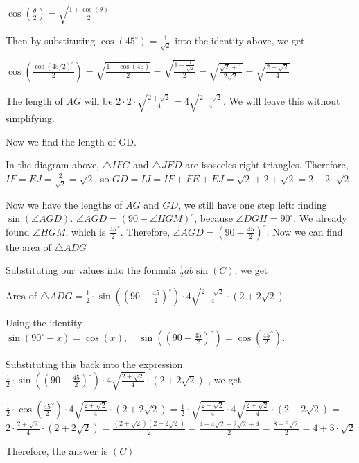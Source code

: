 \begin{enumerate}
 $\cos\left(\frac{\theta}{2}\right) = \sqrt{\frac{1+\cos(\theta)}{2}}$

 Then by substituting $\cos(45^\circ) = \frac{1}{\sqrt{2}}$ into the identity above, we get 

 $\cos\left(\frac{\cos(45/2)^\circ}{2}\right) = \sqrt{\frac{1+\cos(45)}{2}} = \sqrt{\frac{1+\frac{1}{\sqrt{2}}}{2}} = \sqrt{\frac{\sqrt{2}+1}{2\sqrt{2}}} = \sqrt{\frac{2+\sqrt{2}}{4}}$

 The length of $AG$ will be $2 \cdot 2 \cdot \sqrt{\frac{2+\sqrt{2}}{4}} = 4 \sqrt{\frac{2+\sqrt{2}}{4}}$. We will leave this without simplifying. 

 Now we find the length of GD.

 In the diagram above, $\triangle IFG$ and $\triangle JED$ are isosceles right triangles. Therefore, $IF = EJ = \frac{2}{\sqrt{2}} = \sqrt{2}$, so $GD = IJ = IF + FE + EJ = \sqrt{2} + 2 + \sqrt{2} = 2 + 2\cdot \sqrt{2}$

 Now we have the lengths of $AG$ and $GD$, we still have one step left: finding $\sin(\angle AGD)$. $\angle AGD =(90 - \angle HGM)^{\circ}$, because $\angle DGH = 90^\circ$. We already found $\angle HGM$, which is $\frac{45}{2}^{\circ}$. Therefore, $\angle AGD =(90 - \frac{45}{2})^{\circ}$. Now we can find the area of $\triangle ADG$ 

 Substituting our values into the formula $\frac{1}{2}ab\sin(C)$, we get

 $\text{Area of } \triangle ADG = \frac{1}{2} \cdot \sin\left((90-\frac{45}{2})^{\circ}\right) \cdot 4\sqrt{\frac{2+\sqrt{2}}{4}} \cdot (2 + 2\sqrt{2})$ 

 Using the identity $\sin(90^\circ - x) = \cos(x), \quad \sin\left((90-\frac{45}{2})^{\circ}\right) = \cos\left(\frac{45}{2}^\circ\right)$. 

 Substituting this back into the expression $\frac{1}{2} \cdot \sin\left((90-\frac{45}{2})^{\circ}\right) \cdot 4\sqrt{\frac{2+\sqrt{2}}{4}} \cdot (2 + 2\sqrt{2})$ , we get 

 $\frac{1}{2} \cdot \cos\left(\frac{45}{2}^\circ\right) \cdot 4\sqrt{\frac{2+\sqrt{2}}{4}} \cdot (2 + 2\sqrt{2}) = \frac{1}{2} \cdot \sqrt{\frac{2+\sqrt{2}}{4}} \cdot 4\sqrt{\frac{2+\sqrt{2}}{4}} \cdot (2 + 2\sqrt{2})=$$2 \cdot \frac{2+\sqrt{2}}{4} \cdot (2 + 2\sqrt{2}) = \frac{(2+\sqrt{2})(2+2\sqrt{2})}{2} =  \frac{4 + 4\sqrt{2} + 2\sqrt{2} + 4}{2} = \frac{8 + 6\sqrt{2}}{2} = 4 + 3\cdot \sqrt{2}$

 Therefore, the answer is $\boxed{(C)}$




\end{enumerate}
